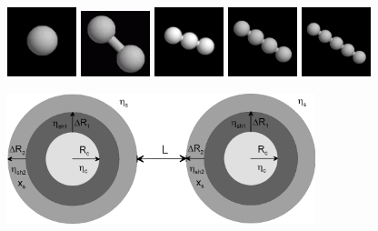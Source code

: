 \begin{figure}[htb]
\begin{center}
\includegraphics[width=0.18\textwidth,height=0.18\textwidth]{../images/form_factor/cluster/tetrahedron1.png}
\includegraphics[width=0.18\textwidth,height=0.18\textwidth]{../images/form_factor/cluster/tetrahedron2.png}
\includegraphics[width=0.18\textwidth,height=0.18\textwidth]{../images/form_factor/cluster/DoubleShellChain3.png}
\includegraphics[width=0.18\textwidth,height=0.18\textwidth]{../images/form_factor/cluster/DoubleShellChain4.png}
\includegraphics[width=0.18\textwidth,height=0.18\textwidth]{../images/form_factor/cluster/DoubleShellChain5.png}
\end{center}
\caption{} \label{doubleshellchain}
\end{figure}

\begin{figure}[htb]
\begin{center}
\includegraphics[width=0.8\textwidth,height=0.337\textwidth]{../images/form_factor/cluster/l_doubleshell.png}
\end{center}
\caption{} \label{doubleshell}
\end{figure}

